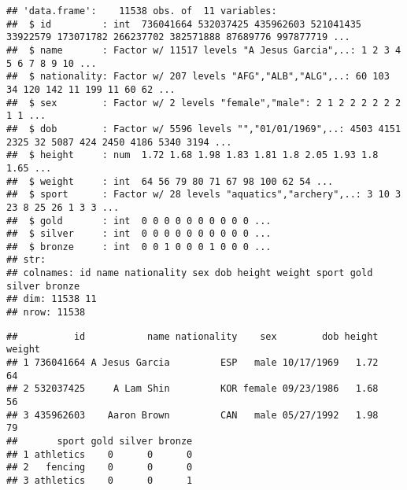 \documentclass[]{article}
\newenvironment{Shaded}{\begin{snugshade}}{\end{snugshade}}
\newcommand{\CommentTok}[1]{\textcolor[rgb]{0.56,0.35,0.01}{\textit{#1}}}
\newcommand{\DecValTok}[1]{\textcolor[rgb]{0.00,0.00,0.81}{#1}}
\newcommand{\KeywordTok}[1]{\textcolor[rgb]{0.13,0.29,0.53}{\textbf{#1}}}
\newcommand{\NormalTok}[1]{#1}
\newcommand{\OperatorTok}[1]{\textcolor[rgb]{0.81,0.36,0.00}{\textbf{#1}}}
\newcommand{\StringTok}[1]{\textcolor[rgb]{0.31,0.60,0.02}{#1}}
\begin{document}
\begin{verbatim}
## 'data.frame':    11538 obs. of  11 variables:
##  $ id         : int  736041664 532037425 435962603 521041435 33922579 173071782 266237702 382571888 87689776 997877719 ...
##  $ name       : Factor w/ 11517 levels "A Jesus Garcia",..: 1 2 3 4 5 6 7 8 9 10 ...
##  $ nationality: Factor w/ 207 levels "AFG","ALB","ALG",..: 60 103 34 120 142 11 199 11 60 62 ...
##  $ sex        : Factor w/ 2 levels "female","male": 2 1 2 2 2 2 2 2 1 1 ...
##  $ dob        : Factor w/ 5596 levels "","01/01/1969",..: 4503 4151 2325 32 5087 424 2450 4186 5340 3194 ...
##  $ height     : num  1.72 1.68 1.98 1.83 1.81 1.8 2.05 1.93 1.8 1.65 ...
##  $ weight     : int  64 56 79 80 71 67 98 100 62 54 ...
##  $ sport      : Factor w/ 28 levels "aquatics","archery",..: 3 10 3 23 8 25 26 1 3 3 ...
##  $ gold       : int  0 0 0 0 0 0 0 0 0 0 ...
##  $ silver     : int  0 0 0 0 0 0 0 0 0 0 ...
##  $ bronze     : int  0 0 1 0 0 0 1 0 0 0 ...
## str: 
## colnames: id name nationality sex dob height weight sport gold silver bronze 
## dim: 11538 11 
## nrow: 11538
\end{verbatim}

\begin{verbatim}
##          id           name nationality    sex        dob height weight
## 1 736041664 A Jesus Garcia         ESP   male 10/17/1969   1.72     64
## 2 532037425     A Lam Shin         KOR female 09/23/1986   1.68     56
## 3 435962603    Aaron Brown         CAN   male 05/27/1992   1.98     79
##       sport gold silver bronze
## 1 athletics    0      0      0
## 2   fencing    0      0      0
## 3 athletics    0      0      1
\end{verbatim}

\begin{Shaded}
\end{Shaded}
\end{document}
